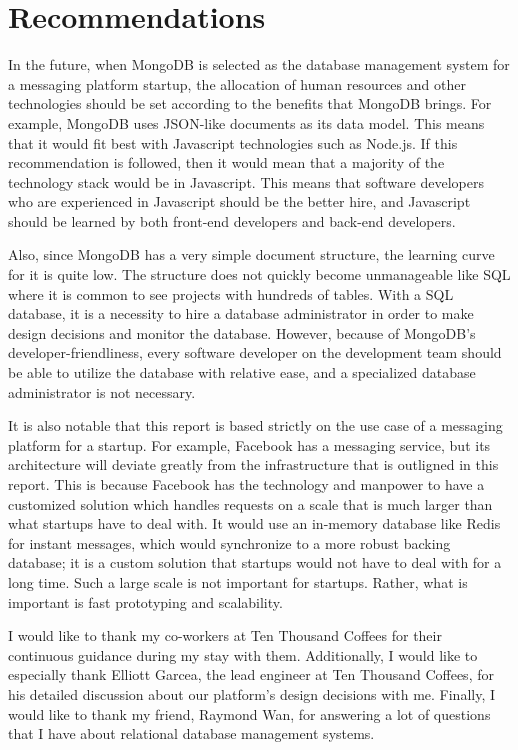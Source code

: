 \documentclass[12pt]{article}
\begin{document}
\section{Recommendations}

In the future, when MongoDB is selected as the database management system for a messaging platform startup, the allocation of human resources and other technologies should be set according to the benefits that MongoDB brings. For example, MongoDB uses JSON-like documents as its data model. This means that it would fit best with Javascript technologies such as Node.js. If this recommendation is followed, then it would mean that a majority of the technology stack would be in Javascript. This means that software developers who are experienced in Javascript should be the better hire, and Javascript should be learned by both front-end developers and back-end developers. 

Also, since MongoDB has a very simple document structure, the learning curve for it is quite low. The structure does not quickly become unmanageable like SQL where it is common to see projects with hundreds of tables. With a SQL database, it is a necessity to hire a database administrator in order to make design decisions and monitor the database. However, because of MongoDB's developer-friendliness, every software developer on the development team should be able to utilize the database with relative ease, and a specialized database administrator is not necessary. 

It is also notable that this report is based strictly on the use case of a messaging platform for a startup. For example, Facebook has a messaging service, but its architecture will deviate greatly from the infrastructure that is outligned in this report. This is because Facebook has the technology and manpower to have a customized solution which handles requests on a scale that is much larger than what startups have to deal with. It would use an in-memory database like Redis for instant messages, which would synchronize to a more robust backing database; it is a custom solution that startups would not have to deal with for a long time. Such a large scale is not important for startups. Rather, what is important is fast prototyping and scalability.

\newpage



\newpage


I would like to thank my co-workers at Ten Thousand Coffees for their continuous guidance during my stay with them. Additionally, I would like to especially thank Elliott Garcea, the lead engineer at Ten Thousand Coffees, for his detailed discussion about our platform's design decisions with me. Finally, I would like to thank my friend, Raymond Wan, for answering a lot of questions that I have about relational database management systems.
\newpage
\end{document}
